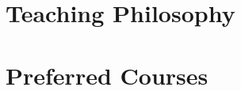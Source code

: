 \documentclass{scrartcl}
\begin{document}
%  

\section{Teaching Philosophy}



\section{Preferred Courses}
\end{document}
